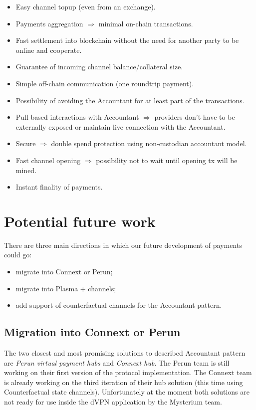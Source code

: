 \documentclass[a4paper,12pt]{article}
\begin{document}
\begin{itemize}
    \item Easy channel topup (even from an exchange).
    \item Payments aggregation $\Longrightarrow$ minimal on-chain transactions.
    \item Fast settlement into blockchain without the need for another party to 
    be online and cooperate.
    \item Guarantee of incoming channel balance/collateral size.
    \item Simple off-chain communication (one roundtrip payment).
    \item Possibility of avoiding the Accountant for at least part of the 
    transactions.
    \item Pull based interactions with Accountant $\Longrightarrow$ providers don’t
    have to be externally exposed or maintain live connection with the Accountant.
    \item Secure $\Longrightarrow$ double spend protection using non-custodian 
    accountant model.
    \item Fast channel opening $\Longrightarrow$ possibility not to wait until 
    opening tx will be mined.
    \item Instant finality of payments.
\end{itemize}

\section{Potential future work}

There are three main directions in which our future development of payments 
could go:
\begin{itemize}
    \item migrate into Connext or Perun;
    \item migrate into Plasma + channels;
    \item add support of counterfactual channels for the Accountant pattern.
\end{itemize}

\subsection{Migration into Connext or Perun}

The two closest and most promising solutions to described Accountant pattern are 
\textit{Perun virtual payment hubs} and \textit{Connext hub}. The Perun team is 
still working on their first version of the protocol implementation. The Connext 
team is already working on the third iteration of their hub solution (this time 
using Counterfactual state channels). Unfortunately at the moment both solutions 
are not ready for use inside the dVPN application by the Mysterium team.
\end{document}
